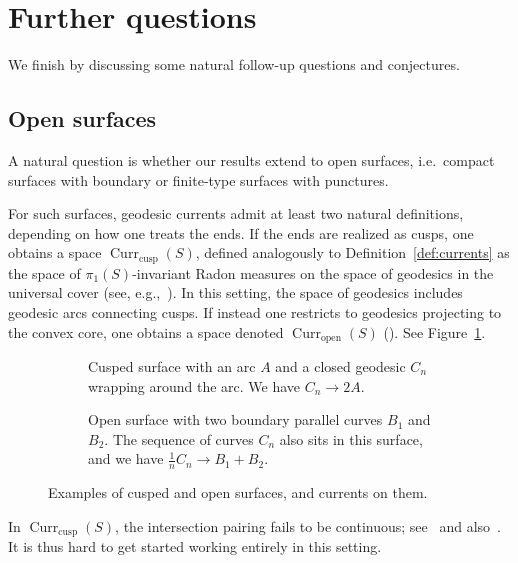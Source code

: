 \documentclass[11pt]{amsart}
\newcommand*{\svgfigbig}[1]{\fontsize{14pt}{14pt}\selectfont}
\numberwithin{equation}{section}
\numberwithin{figure}{section}
\theoremstyle{definition}
\theoremstyle{plain}
\DeclareMathOperator{\Curr}{Curr}
\begin{document}

\section{Further questions}
\label{sec:questions}

We finish by discussing some natural follow-up questions and conjectures.

\subsection{Open surfaces}
A natural question is whether our results extend to open surfaces, i.e.\ compact surfaces with boundary or finite-type surfaces with punctures.

For such surfaces, geodesic currents admit at least two natural definitions, depending on how one treats the ends. 
If the ends are realized as cusps, one obtains a space $\Curr_{\mathrm{cusp}}(S)$, defined analogously to Definition~\ref{def:currents} as the space of $\pi_1(S)$-invariant 
Radon measures on the space of geodesics in the universal cover (see, e.g.,~\cite[Definition~2.2]{Sas22:Currents}). In this setting, the space of geodesics includes geodesic arcs connecting cusps. 
If instead one restricts to geodesics projecting to the convex core,
one obtains a space denoted $\Curr_{\mathrm{open}}(S)$ (\cite[Section~2.6]{DLR10:DegenerationFlatMetrics}). See
Figure~\ref{fig:open_surfaces}.

\begin{figure}
\centering
\begin{subfigure}{0.48\textwidth}
\centering
\resizebox{60mm}{!}{
\svgfigbig{cusp}}
\caption{Cusped surface with an arc $A$ and a closed geodesic $C_n$
  wrapping around the arc. We have $C_n \to 2A$.}
\end{subfigure}
\hfill
\begin{subfigure}{0.48\textwidth}
\centering
\resizebox{60mm}{!}{
\svgfigbig{open}}
\caption{Open surface with two boundary parallel curves $B_1$ and $B_2$. The sequence of curves $C_n$ also sits in this surface, and we have $\frac{1}{n}C_n \to B_1 + B_2$.}
\end{subfigure}
\caption{Examples of cusped and open surfaces, and currents on them.}
\label{fig:open_surfaces}
\end{figure}

In $\Curr_{\mathrm{cusp}}(S)$, the intersection pairing fails to be
continuous; see~\cite[Remark~2.26]{MGT21:Smoothings} and
also~\cite{Sas22:Currents, T22:ThurstonCompactification}. It is thus
hard to get started working entirely in this setting.
\end{document}
